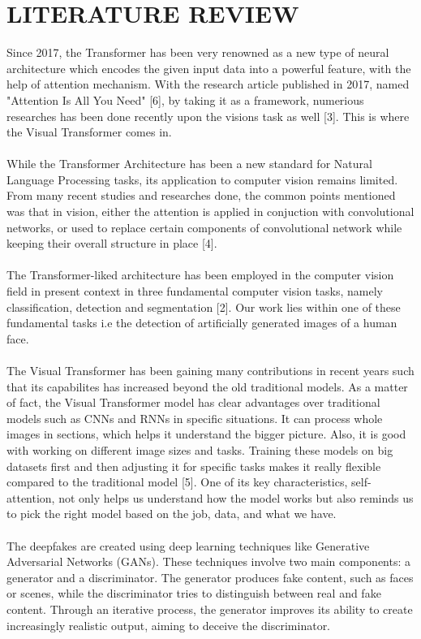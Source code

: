 \section{LITERATURE REVIEW}
Since 2017, the Transformer has been very renowned as a new type of neural architecture which encodes the given input data into a powerful feature, with the help of attention mechanism.  With the research article published in 2017, named "Attention Is All You Need" [6], by taking it as a framework, numerious researches has been done recently upon the visions task as well [3]. This is where the Visual Transformer comes in. 
\\\\
While the Transformer Architecture has been a new standard for Natural Language Processing tasks, its application to computer vision remains limited. From many recent studies and researches done, the common points mentioned was that in vision, either the attention is applied in conjuction with convolutional networks, or used to replace certain components of convolutional network while keeping their overall structure in place [4].
\\\\
The Transformer-liked architecture has been employed in the computer vision field in present context in three fundamental computer vision tasks, namely classification, detection and segmentation [2]. Our work lies within one of these fundamental tasks i.e the detection of artificially generated images of a human face.
\\\\
 The Visual Transformer has been gaining many contributions in recent years such that its capabilites has increased beyond the old traditional models. As a matter of fact, the Visual Transformer model has clear advantages over traditional models such as CNNs and RNNs in specific situations. It can process whole images in sections, which helps it understand the bigger picture. Also, it is good with working on different image sizes and tasks. 
 Training these models on big datasets first and then adjusting it for specific tasks makes it really flexible compared to the traditional model [5]. 
 One of its key characteristics, self-attention, not only helps us understand how the model works but also reminds us to pick the right model based on the job, data, and what we have.
\\\\
The deepfakes are created using deep learning techniques like Generative Adversarial Networks (GANs). These techniques involve two main components: a generator and a discriminator. The generator produces fake content, such as faces or scenes, while the discriminator tries to distinguish between real and fake content. Through an iterative process, the generator improves its ability to create increasingly realistic output, aiming to deceive the discriminator. 
